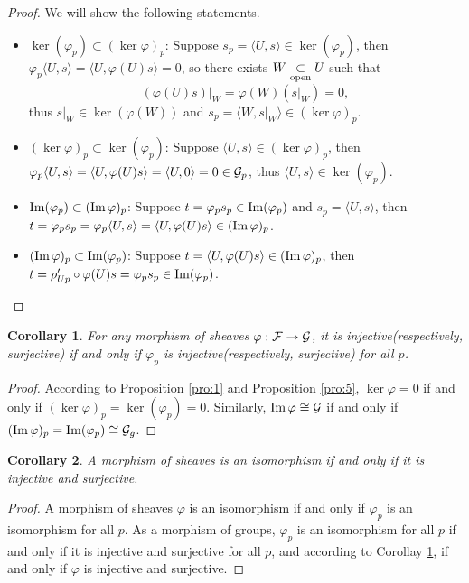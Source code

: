 \documentclass[8pt]{article}
\theoremstyle{plain}
\newtheorem{cor}{Corollary}
\begin{document}
\begin{proof}
We will show the following statements.
	\begin{itemize}
		\item $\ker(\varphi_p)\subset (\ker \varphi)_p$: Suppose $s_p=\langle U,s\rangle\in \ker(\varphi_p)$, then $\varphi_p\langle U,s\rangle=\langle U,\varphi(U)s\rangle=0$, so there exists $W\underset{\mathrm{open}}{\subset} U$ such that 
		\[
			(\varphi(U)s)|_W=\varphi(W)(s|_W)=0,
		\]
		thus $s|_W\in \ker(\varphi(W))$ and $s_p=\langle W,s|_W\rangle\in (\ker \varphi)_p$.

		\item $(\ker \varphi)_p\subset\ker(\varphi_p)$: Suppose $\langle U,s\rangle\in (\ker \varphi)_p$, then $\varphi_p\langle U,s\rangle=\langle U,\varphi(U)s\rangle=\langle U,0\rangle=0\in \mathcal{G}_p$, thus $\langle U,s\rangle\in \ker(\varphi_p)$.

		\item $\operatorname{Im}(\varphi_p)\subset (\operatorname{Im} \varphi)_p$: Suppose $t=\varphi_ps_p\in\operatorname{Im} (\varphi_p)$ and $s_p=\langle U,s\rangle$, then $t=\varphi_ps_p=\varphi_p\langle U,s\rangle=\langle U,\varphi(U)s\rangle\in (\operatorname{Im} \varphi)_p$.

		\item $(\operatorname{Im} \varphi)_p\subset \operatorname{Im}(\varphi_p)$: Suppose $t=\langle U,\varphi(U)s\rangle\in (\operatorname{Im} \varphi)_p$, then $t=\rho'_{Up}\circ\varphi(U)s=\varphi_p s_p \in \operatorname{Im}(\varphi_p)$.
	\end{itemize}
\end{proof}
\begin{cor}
	For any morphism of sheaves $\varphi:\mathcal{F}\to\mathcal{G}$, it is injective(respectively, surjective) if and only if $\varphi_p$ is injective(respectively, surjective) for all $p$.
	\label{cor:1}
\end{cor}
\begin{proof}
	According to Proposition \ref{pro:1} and Proposition \ref{pro:5}, $\ker \varphi=0$ if and only if $(\ker \varphi)_p=\ker(\varphi_p)=0$. Similarly, $\operatorname{Im} \varphi\cong \mathcal{G}$ if and only if $(\operatorname{Im} \varphi)_p=\operatorname{Im}(\varphi_p)\cong \mathcal{G}_g$.
\end{proof}
\begin{cor}
	A morphism of sheaves is an isomorphism if and only if it is injective and surjective.
\end{cor}
\begin{proof}
	A morphism of sheaves $\varphi$ is an isomorphism if and only if $\varphi_p$ is an isomorphism for all $p$. As a morphism of groups, $\varphi_p$ is an isomorphism for all $p$ if and only if it is injective and surjective for all $p$, and according to Corollay \ref{cor:1}, if and only if $\varphi$ is injective and surjective.
\end{proof}
\end{document}
